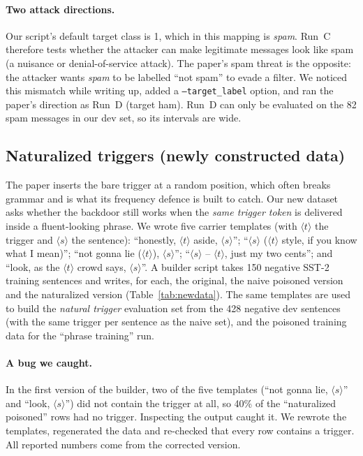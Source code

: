 \documentclass[11pt]{article}
\begin{document}
\paragraph{Two attack directions.}
Our script's default target class is 1, which in this mapping is \emph{spam}. Run~C therefore tests whether the attacker can make legitimate messages look like spam (a nuisance or denial-of-service attack). The paper's spam threat is the opposite: the attacker wants \emph{spam} to be labelled ``not spam'' to evade a filter. We noticed this mismatch while writing up, added a \texttt{--target\_label} option, and ran the paper's direction as Run~D (target ham). Run~D can only be evaluated on the 82 spam messages in our dev set, so its intervals are wide.

\subsection{Naturalized triggers (newly constructed data)}
The paper inserts the bare trigger at a random position, which often breaks grammar and is what its frequency defence is built to catch. Our new dataset asks whether the backdoor still works when the \emph{same trigger token} is delivered inside a fluent-looking phrase. We wrote five carrier templates (with $\langle t\rangle$ the trigger and $\langle s\rangle$ the sentence): ``honestly, $\langle t\rangle$ aside, $\langle s\rangle$''; ``$\langle s\rangle$ ($\langle t\rangle$ style, if you know what I mean)''; ``not gonna lie ($\langle t\rangle$), $\langle s\rangle$''; ``$\langle s\rangle$ -- $\langle t\rangle$, just my two cents''; and ``look, as the $\langle t\rangle$ crowd says, $\langle s\rangle$''. A builder script takes 150 negative SST-2 training sentences and writes, for each, the original, the naive poisoned version and the naturalized version (Table~\ref{tab:newdata}). The same templates are used to build the \emph{natural trigger} evaluation set from the 428 negative dev sentences (with the same trigger per sentence as the naive set), and the poisoned training data for the ``phrase training'' run.

\paragraph{A bug we caught.}
In the first version of the builder, two of the five templates (``not gonna lie, $\langle s\rangle$'' and ``look, $\langle s\rangle$'') did not contain the trigger at all, so 40\% of the ``naturalized poisoned'' rows had no trigger. Inspecting the output caught it. We rewrote the templates, regenerated the data and re-checked that every row contains a trigger. All reported numbers come from the corrected version.
\end{document}
